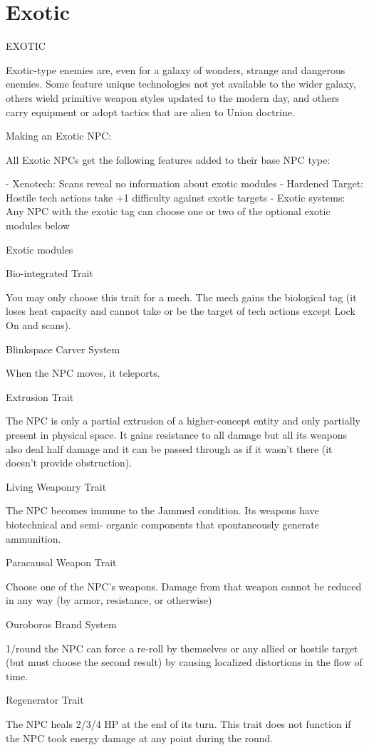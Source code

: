 \section{Exotic}
                                                      EXOTIC   

Exotic-type enemies are, even for a galaxy of wonders, strange and dangerous enemies. Some  
feature unique technologies not yet available to the wider galaxy, others wield primitive weapon  
styles updated to the modern day, and others carry equipment or adopt tactics that are alien to  
Union doctrine.  
 
 
Making an Exotic NPC:
 
All Exotic NPCs get the following features added to their base NPC type:
 
     -   Xenotech: Scans reveal no information about exotic modules  
     -   Hardened Target: Hostile tech actions take +1 difficulty against exotic targets  
     -   Exotic systems: Any NPC with the exotic tag can choose one or two of the optional  
         exotic modules below  

Exotic modules
 
Bio-integrated  
Trait
 
You may only choose this trait for a mech. The mech gains the biological tag (it loses heat  
capacity and cannot take or be the target of tech actions except Lock On and scans).
 

                                                                                                                     


Blinkspace Carver  
System
 
When the NPC moves, it teleports.
 

Extrusion  
Trait
 
The NPC is only a partial extrusion of a higher-concept entity and only partially present in  
physical space. It gains resistance to all damage but all its weapons also deal half damage and it  
can be passed through as if it wasn’t there (it doesn’t provide obstruction).
 

Living Weaponry  
Trait
 
The NPC becomes immune to the Jammed condition. Its weapons have biotechnical and semi- 
organic components that spontaneously generate ammunition.
 

Paracausal Weapon  
Trait
 
Choose one of the NPC’s weapons. Damage from that weapon cannot be reduced in any way  
(by armor, resistance, or otherwise)
 

Ouroboros Brand  
System
 
1/round the NPC can force a re-roll by themselves or any allied or hostile target (but must choose  
the second result) by causing localized distortions in the flow of time.
 

Regenerator  
Trait
 
The NPC heals 2/3/4 HP at the end of its turn. This trait does not function if the NPC took energy  
damage at any point during the round.